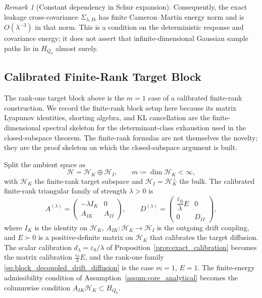 \documentclass[preprint,12pt]{elsarticle}
\theoremstyle{plain}
\theoremstyle{definition}
\theoremstyle{remark}
\newtheorem{remark}[theorem]{Remark}
\begin{document}
    \begin{remark}[Constant dependency in Schur expansion]
        Consequently, the exact leakage cross-covariance
        $\Sigma_{\lambda,Ik}$ has finite Cameron--Martin energy norm and is
        $O(\lambda^{-3})$ in that norm.  This is a condition on the deterministic
        response and covariance energy; it does not assert that infinite-dimensional
        Gaussian sample paths lie in $H_{Q_0}$ almost surely.
    \end{remark}

    \subsection{Calibrated Finite-Rank Target Block}
    \label{sec:setup:finite_rank}

    The rank-one target block above is the $m=1$ case of a calibrated
    finite-rank construction.  We record the finite-rank block setup here
    because its matrix Lyapunov identities, shorting algebra, and KL
    cancellation are the finite-dimensional spectral skeleton for the
    determinant-class exhaustion used in the closed-subspace theorem.  The
    finite-rank formulas are not themselves the novelty; they are the proof
    skeleton on which the closed-subspace argument is built.

    Split the ambient space as
    \begin{equation}
        \label{eq:finite_rank_split}
        \mathcal{H}=\mathcal{H}_K\oplus\mathcal{H}_I,
        \qquad
        m\coloneqq\dim\mathcal{H}_K<\infty,
    \end{equation}
    with $\mathcal{H}_K$ the finite-rank target subspace and
    $\mathcal{H}_I=\mathcal{H}_K^\perp$ the bulk.  The calibrated finite-rank
    triangular family of strength $\lambda>0$ is
    \begin{equation}
        \label{eq:finite_rank_blocks}
        A^{(\lambda)}=
        \begin{pmatrix}-\lambda I_K&0\\ A_{IK}&A_{II}\end{pmatrix},
        \qquad
        D^{(\lambda)}=
        \begin{pmatrix}\dfrac{\varepsilon_0}{\lambda}E&0\\[2pt]0&D_{II}\end{pmatrix},
    \end{equation}
    where $I_K$ is the identity on $\mathcal{H}_K$,
    $A_{IK}:\mathcal{H}_K\to\mathcal{H}_I$ is the outgoing drift coupling, and
    $E\succ0$ is a positive-definite matrix on $\mathcal{H}_K$ that calibrates
    the target diffusion.  The scalar calibration $d_\lambda=\varepsilon_0/\lambda$
    of Proposition~\ref{prop:exact_calibration} becomes the matrix calibration
    $\tfrac{\varepsilon_0}{\lambda}E$, and the rank-one family
    \eqref{eq:block_decoupled_drift_diffusion} is the case $m=1$, $E=1$.  The
    finite-energy admissibility condition of
    Assumption~\ref{assum:core_analytical} becomes the columnwise condition
    $A_{IK}\mathcal{H}_K\subset H_{Q_0}$.
\end{document}
